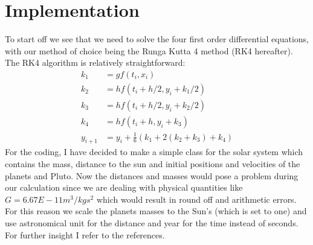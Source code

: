 \documentclass{article}
\begin{document}
\section{Implementation}
To start off we see that we need to solve the four first order differential equations, with our method of choice being the Runga Kutta 4 method (RK4 hereafter). The RK4 algorithm is relatively straightforward: 
\begin{align*}
k_1 &= gf(t_i,x_i)\\
k_2 &= hf(t_i + h/2,y_i + k_1/2)\\
k_3 &= hf(t_i + h/2, y_i + k_2/2)\\
k_4 &= hf(t_i + h, y_i + k_3)\\
y_{i+1} &= y_i + \frac{1}{6}(k_1+2(k_2 + k_3) + k_4)
\end{align*}
For the coding, I have decided to make a simple class for the solar system which contains the mass, distance to the sun and initial positions and velocities of the planets and Pluto. Now the distances and masses would pose a problem during our calculation since we are dealing with physical quantities like $G = 6.67E-11m^3/kgs^2$ which would result in round off and arithmetic errors. For this reason we scale the planets masses to the Sun's (which is set to one) and use astronomical unit for the distance and year for the time instead of seconds. For further insight I refer to the references.
\end{document}
